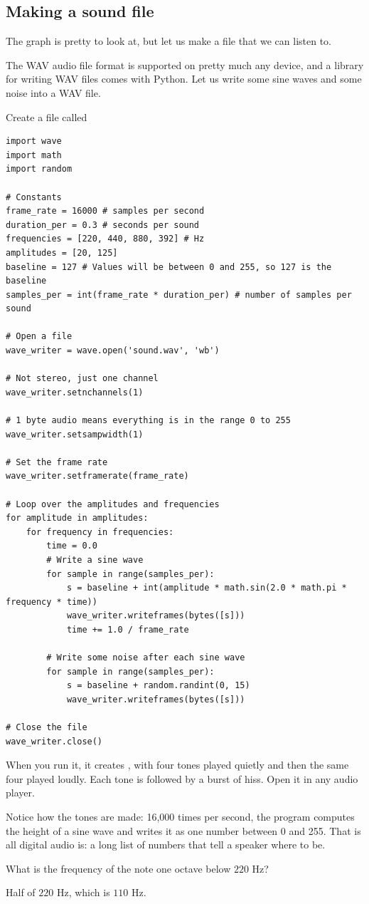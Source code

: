 \subsection{Making a sound file}

The graph is pretty to look at, but let us make a file that we can listen to.

The WAV audio file format is supported on pretty much any device, and
a library for writing WAV files comes with Python. Let us write some
sine waves and some noise into a WAV file.

Create a file called 

\begin{verbatim}
import wave
import math
import random

# Constants
frame_rate = 16000 # samples per second
duration_per = 0.3 # seconds per sound
frequencies = [220, 440, 880, 392] # Hz
amplitudes = [20, 125]
baseline = 127 # Values will be between 0 and 255, so 127 is the baseline
samples_per = int(frame_rate * duration_per) # number of samples per sound

# Open a file
wave_writer = wave.open('sound.wav', 'wb')

# Not stereo, just one channel
wave_writer.setnchannels(1)

# 1 byte audio means everything is in the range 0 to 255
wave_writer.setsampwidth(1)

# Set the frame rate
wave_writer.setframerate(frame_rate)

# Loop over the amplitudes and frequencies
for amplitude in amplitudes:
    for frequency in frequencies:
        time = 0.0
        # Write a sine wave
        for sample in range(samples_per):
            s = baseline + int(amplitude * math.sin(2.0 * math.pi * frequency * time))
            wave_writer.writeframes(bytes([s]))
            time += 1.0 / frame_rate
            
        # Write some noise after each sine wave
        for sample in range(samples_per):
            s = baseline + random.randint(0, 15)
            wave_writer.writeframes(bytes([s]))
            
# Close the file
wave_writer.close()
\end{verbatim}

When you run it, it creates , with four tones played
quietly and then the same four played loudly. Each tone is followed by a
burst of hiss. Open it in any audio player.

Notice how the tones are made: 16,000 times per second, the program
computes the height of a sine wave and writes it as one number between 0
and 255. That is all digital audio is: a long list of numbers that tell a
speaker where to be.

\begin{Exercise}[title={One Octave Down}, label=sound2]
What is the frequency of the note one octave below $220$ Hz?
\end{Exercise}
\begin{Answer}[ref=sound2]
Half of $220$ Hz, which is $110$ Hz.
\end{Answer}
